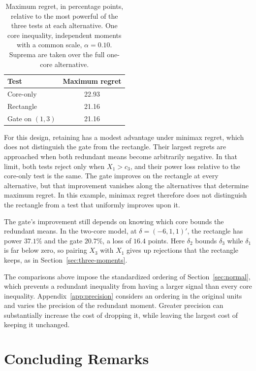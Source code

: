 \documentclass[11pt]{article}
\numberwithin{equation}{section}
\theoremstyle{definition}
\begin{document}
\begin{table}[!ht]
\centering

\begin{tabular}{lc}
\toprule
Test & Maximum regret\\
\midrule
Core-only & 22.93\\
Rectangle & 21.16\\
Gate on $(1,3)$ & 21.16\\
\bottomrule
\end{tabular}
\caption{Maximum regret, in percentage points, relative to the most powerful of the three tests at each alternative. One core inequality, independent moments with a common scale, $\alpha=0.10$. Suprema are taken over the full one-core alternative.}
\label{tab:one-core-regret}
\end{table}

For this design, retaining has a modest advantage under minimax regret, which does not distinguish the gate from the rectangle. Their largest regrets are approached when both redundant means become arbitrarily negative. In that limit, both tests reject only when $X_1>c_3$, and their power loss relative to the core-only test is the same. The gate improves on the rectangle at every alternative, but that improvement vanishes along the alternatives that determine maximum regret. In this example, minimax regret therefore does not distinguish the rectangle from a test that uniformly improves upon it.

The gate's improvement still depends on knowing which core bounds the redundant means. In the two-core model, at $\delta=(-6,1,1)'$, the rectangle has power $37.1\%$ and the gate $20.7\%$, a loss of $16.4$ points. Here $\delta_2$ bounds $\delta_3$ while $\delta_1$ is far below zero, so pairing $X_3$ with $X_1$ gives up rejections that the rectangle keeps, as in Section~\ref{sec:three-moments}.

The comparisons above impose the standardized ordering of Section~\ref{sec:normal}, which prevents a redundant inequality from having a larger signal than every core inequality. Appendix~\ref{app:precision} considers an ordering in the original units and varies the precision of the redundant moment. Greater precision can substantially increase the cost of dropping it, while leaving the largest cost of keeping it unchanged.


\section{Concluding Remarks}\label{sec:conclusions}
\end{document}
